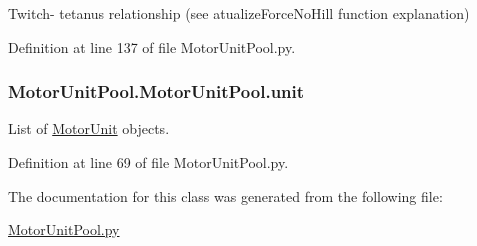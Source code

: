 Twitch-\/ tetanus relationship (see atualize\+Force\+No\+Hill function explanation) 



Definition at line 137 of file Motor\+Unit\+Pool.\+py.

\subsubsection[{\texorpdfstring{unit}{unit}}]{\setlength{\rightskip}{0pt plus 5cm}Motor\+Unit\+Pool.\+Motor\+Unit\+Pool.\+unit}\hypertarget{class_motor_unit_pool_1_1_motor_unit_pool_a1b14c831606c27efae62f1468850393b}{}\label{class_motor_unit_pool_1_1_motor_unit_pool_a1b14c831606c27efae62f1468850393b}


List of \hyperlink{namespace_motor_unit}{Motor\+Unit} objects. 



Definition at line 69 of file Motor\+Unit\+Pool.\+py.



The documentation for this class was generated from the following file\+:\begin{DoxyCompactItemize}
\item 
\hyperlink{_motor_unit_pool_8py}{Motor\+Unit\+Pool.\+py}\end{DoxyCompactItemize}
